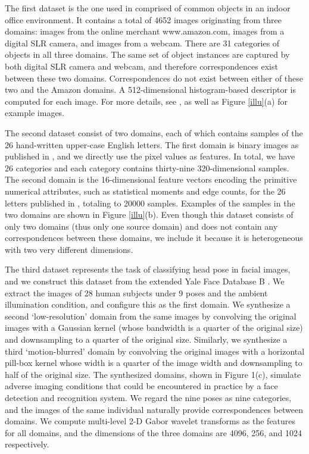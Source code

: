 \documentclass[10pt,twocolumn,letterpaper]{article}
\begin{document}
The first dataset is the one used in \cite{Saenko:ML,Kulis:ML,Gopalan:Grassmann,Gong:Grassmann} comprised of common objects in an indoor office environment. It contains a total of 4652 images originating from three domains: images from the online merchant www.amazon.com, images from a digital SLR camera, and images from a webcam. There are 31 categories of objects in all three domains. The same set of object instances are captured by both digital SLR camera and webcam, and therefore correspondences exist between these two domains. Correspondences do not exist between either of these two and the Amazon domains. A 512-dimensional histogram-based descriptor is computed for each image. For more details, see \cite{Saenko:ML}, as well as Figure \ref{illu}(a) for example images.

The second dataset consist of two domains, each of which contains samples of the 26 hand-written upper-case English letters. The first domain is binary images as published in \cite{letterimage}, and we directly use the pixel values as features. In total, we have 26 categories and each category contains thirty-nine 320-dimensional samples. The second domain is the 16-dimensional feature vectors encoding the primitive numerical attributes, such as statistical moments and edge counts, for the 26 letters published in \cite{letterattr}, totaling to 20000 samples. Examples of the samples in the two domains are shown in Figure \ref{illu}(b). Even though this dataset consists of only two domains (thus only one source domain) and does not contain any correspondences between these domains, we include it because it is heterogeneous with two very different dimensions.

The third dataset represents the task of classifying head pose in facial images, and we construct this dataset from the extended Yale Face Database B \cite{GeBeKr01}. We extract the images of 28 human subjects under 9 poses and the ambient illumination condition, and configure this as the first domain. We synthesize a second `low-resolution' domain from the same images by convolving the original images with a Gaussian kernel (whose bandwidth is a quarter of the original size) and downsampling to a quarter of the original size. Similarly, we synthesize a third `motion-blurred' domain by convolving the original images with a horizontal pill-box kernel whose width is a quarter of the image width and downsampling to half of the original size. The synthesized domains, shown in Figure 1(c), simulate adverse imaging conditions that could be encountered in practice by a face detection and recognition system. We regard the nine poses as nine categories, and the images of the same individual naturally provide correspondences between domains. We compute multi-level 2-D Gabor wavelet transforms as the features for all domains, and the dimensions of the three domains are 4096, 256, and 1024 respectively.
\end{document}
